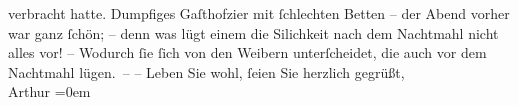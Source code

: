 \begin{ledgroupsized}[t]{13cm}
{{{               }}}\label{K_L02961-2h} verbracht hatte. Dumpfiges Gaſthofzi{\geminationm}er mit ſchlechten Betten – der Abend
               vorher war ganz ſchön; – denn was lügt einem die Si{\geminationn}lichkeit nach dem {\pb}Nachtmahl \introOben{}nicht\introOben{} alles vor! – Wodurch ſie ſich von den
               Weibern unterſcheidet, die auch vor dem Nachtmahl lügen. –\pend
           \pstart
           – Leben Sie wohl, ſeien Sie herzlich gegrüßt, {\\[\baselineskip]}\spacefill\mbox{Arthur}\pend
           \leftskip=0em{}
         
         \endnumbering{}\end{ledgroupsized}  \newcommand{\dateiname}{L02961}\newcommand{\titel}{Arthur Schnitzler an Felix Salten, 17. 8. 1893}\newcommand{\editorInnen}{Martin Anton Müller und Laura Untner}
      